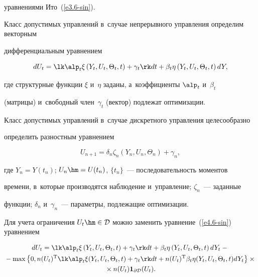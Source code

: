 уравнениями Ито~(\ref{e3.6-sin}).



Класс допустимых управлений в~случае непрерывного управ\-ле\-ния определим векторным 

дифференциальным уравнением

\begin{equation}

dU_t =\lk \alp_t\xi \left(Y_t,U_t,\Theta_t,t\right) + \gamma_t \rk dt + \beta_t \eta 

\left(Y_t,U_t,\Theta_t,t\right) dY,\label{e4.6-sin}

\end{equation}

где структурные функции $\xi$ и~$\eta$ заданы, а~коэффициенты  $\alp_t$ и~$\beta_t$ 

(матрицы) и~свободный член~$\gamma_t$ (вектор) подлежат оптимизации.



Класс допустимых управлений в~случае дискретного управления целесообразно 

определить разностным уравнением

   \begin{equation}

   U_{n+1} = \delta_n \zeta_n \left(Y_n, U_n, \Theta_n\right) + \gamma_n,\label{e4.7-sin}

   \end{equation}

где  $Y_n = Y(t_n)$; $ U_n \hm= U(t_n)$, $\{ t_n\}$~--- последовательность моментов 

времени, в~которые производятся наблюдение и~управ\-ле\-ние;  $\zeta_n$~--- заданные 

функции;  $\delta_n$ и~$\gamma_n$~--- параметры, подлежащие оптимизации.



Для учета ограничения  $U_t\hm\in \cD$ можно заменить уравнение~(\ref{e4.6-sin}) уравнением

\begin{multline}

dU_t =\lk \alp_t \xi \left(Y_t,U_t,\Theta_t,t\right)  +\gamma_t \rk dt + \beta_t \eta 

\left(Y_t,U_t,\Theta_t,t\right) dY_t -{}\\

{}-

\max \left\{ 0, n(U_t)^{\mathrm{T}} \lk \alp_t\xi (Y_t,U_t,\Theta_t,t) +\gamma_t\rk 

dt + n(U_t)^{\mathrm{T}} \beta_t\eta (Y_t,U_t,\Theta_t,t) dY_t\right\}\times{}\\

{}\times  n(U_t) \mathbf{1}_{\partial \cD} (U_t).

\label{e4.8-sin}

\end{multline}

